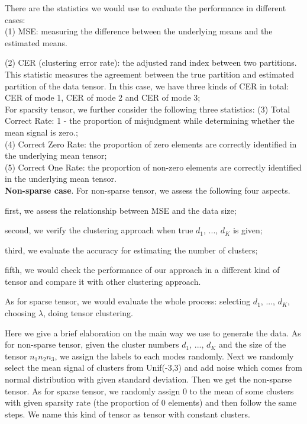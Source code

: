 \documentclass{article}
\begin{document}
There are the statistics we would use to evaluate the performance in different cases:\\
(1) MSE: measuring the difference between the underlying means and the estimated means.\par  
(2) CER (clustering error rate): the adjusted rand index between two partitions. This statistic measures the agreement between the true partition and estimated partition of the data tensor. In this case, we have three kinds of CER in total: CER of mode 1, CER of mode 2 and CER of mode 3;\\

For sparsity tensor, we further consider the following three statistics:
(3) Total Correct Rate: 1 - the proportion of misjudgment while determining whether the mean signal is zero.;\\
(4) Correct Zero Rate: the proportion of zero elements are correctly identified in the underlying mean tensor;\\
(5) Correct One Rate: the proportion of non-zero elements are correctly identified in the underlying mean tensor.\\

{\bf Non-sparse case}.
For non-sparse tensor, we assess the following four aspects.

first, we assess the relationship between MSE and the data size; 

second, we verify the clustering approach when true $d_1$, ..., $d_K$ is given; 

third, we evaluate the accuracy for estimating the number of clusters; 

fifth, we would check the performance of our approach in a different kind of tensor and compare it with other clustering approach. 

As for sparse tensor, we would evaluate the whole process: selecting $d_1$, ..., $d_K$, choosing $\lambda$, doing tensor clustering.\par 


Here we give a brief elaboration on the main way we use to generate the data. As for non-sparse tensor, given the cluster numbers $d_1$, ..., $d_K$ and the size of the tensor $n_1n_2n_3$, we assign the labels to each modes randomly. Next we randomly select the mean signal of clusters from Unif(-3,3) and add noise which comes from normal distribution with given standard deviation. Then we get the non-sparse tensor. As for sparse tensor, we randomly assign 0 to the mean of some  clusters with given sparsity rate (the proportion of 0 elements) and then follow the same steps. We name this kind of tensor as tensor with constant clusters.\par 
\end{document}
